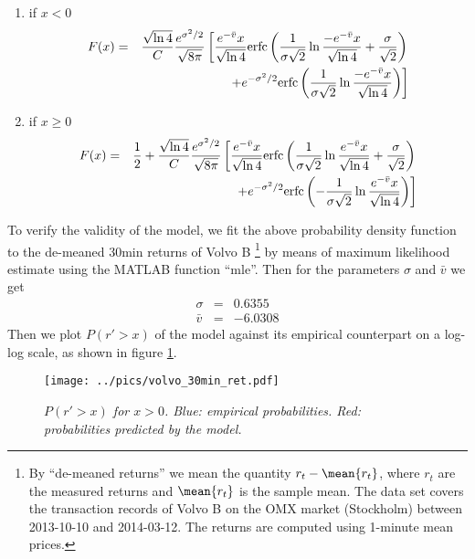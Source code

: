 \begin{enumerate}
\item if $x < 0$
  \begin{eqnarray*}
    F(x) &=& {\sqrt{\ln 4} \over C}{e^{\sigma^2 / 2} \over \sqrt{8\pi}}
    \left[
      {e^{-\bar{v}}x \over \sqrt{\ln 4}}\text{erfc}\left(
        {1 \over \sigma \sqrt 2} \ln{-e^{-\bar{v}}x \over \sqrt{\ln
            4}} + {\sigma \over \sqrt 2}
      \right) \right.\\
      && \left. + e^{-\sigma^2 / 2} \text{erfc}\left(
        {1 \over \sigma \sqrt 2} \ln{-e^{-\bar{v}}x \over \sqrt{\ln 4}}
      \right)
    \right]
  \end{eqnarray*}
\item if $x \geq 0$
  \begin{eqnarray*}
    F(x) &=& \frac{1}{2} + {\sqrt{\ln 4} \over C}{e^{\sigma^2 / 2} \over
      \sqrt{8\pi}} \left[
      {e^{-\bar{v}}x \over \sqrt{\ln 4}} \text{erfc}\left(
        {1 \over \sigma \sqrt 2} \ln{e^{-\bar{v}}x \over \sqrt{\ln
            4}} + {\sigma \over \sqrt 2}
      \right) \right. \\
      && \left. + e^{-\sigma^2/2} \text{erfc}\left(
        -{1 \over \sigma \sqrt 2} \ln{e^{-\bar{v}}x \over \sqrt{\ln 4}}
      \right)
    \right]
  \end{eqnarray*}
\end{enumerate}

To verify the validity of the model, we fit the above probability
density function to the de-meaned 30min returns of Volvo B
\footnote{By ``de-meaned returns'' we mean the quantity $r_t - 
  \mean{r_t}$, where $r_t$ are the measured returns and $\mean{r_t}$
  is the sample mean. The data set covers the transaction records of
  Volvo B on the OMX market (Stockholm) between 2013-10-10 and
  2014-03-12. The returns are computed using 1-minute mean prices.}
by means of maximum likelihood estimate using the MATLAB function
``mle''. Then for the parameters $\sigma$ and $\bar{v}$ we get
\begin{eqnarray*}
  \sigma &=& 0.6355 \\
  \bar{v} &=& -6.0308
\end{eqnarray*}
Then we plot $P(r' > x)$ of the model against its empirical
counterpart on a log-log scale, as shown in figure
\ref{fig:volvo_30min_ret}.
\begin{figure}[htb!]
  \begin{center}
    \texttt{[image: ../pics/volvo\_30min\_ret.pdf]}
  \end{center}
  \caption{\small \it{$P(r' > x)$ for $x > 0$. Blue: empirical
      probabilities. Red: probabilities predicted by the model.}}
  \label{fig:volvo_30min_ret}
\end{figure}

